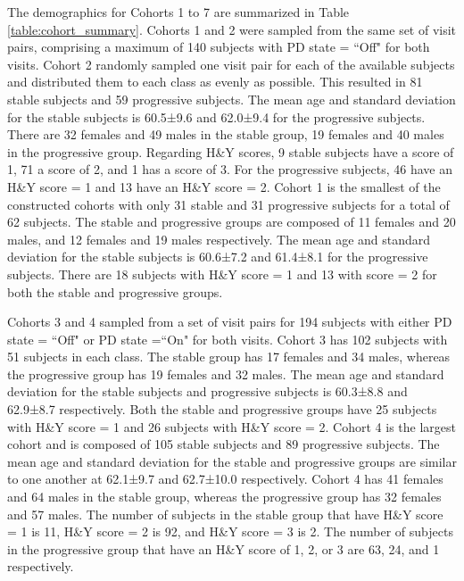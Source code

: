 The demographics for Cohorts 1 to 7 are summarized in Table \ref{table:cohort_summary}. Cohorts 1 and 2 were sampled from the same set of visit pairs, comprising a 
maximum of 140 subjects with PD state = ``Off" for both visits. Cohort 2 randomly sampled one visit pair for each of the available subjects and 
distributed them to each class as evenly as possible. This resulted in 81 stable subjects and 59 progressive subjects. The mean age and standard deviation for the stable subjects 
is 60.5±9.6 and 62.0±9.4 for the progressive subjects. There are 32 females and 49 males in the stable group, 19 females and 40 males in the progressive group. 
Regarding H\&Y scores, 9 stable subjects have a score of 1, 71 a score of 2, and 1 has a score of 3. For the progressive subjects, 46 have an H\&Y 
score = 1 and 13 have an H\&Y score = 2. Cohort 1 is the smallest of the constructed cohorts with only 31 stable and 31 progressive subjects for a total of 62 
subjects. The stable and progressive groups are composed of 11 females and 20 males, and 12 females and 19 males respectively. The mean age and standard deviation for the stable 
subjects is 60.6±7.2 and 61.4±8.1 for the progressive subjects. There are 18 subjects with H\&Y score = 1 and 13 with score = 2 for both the stable and progressive 
groups.

Cohorts 3 and 4 sampled from a set of visit pairs for 194 subjects with either PD state = ``Off" or PD state =``On" for both visits. Cohort 3 has 102 subjects with 
51 subjects in each class. The stable group has 17 females and 34 males, whereas the progressive group has 19 females and 32 males. The mean age and standard deviation for the stable 
subjects and progressive subjects is 60.3±8.8 and 62.9±8.7 respectively. Both the stable and progressive groups have 25 subjects with H\&Y score = 1 and 26 subjects 
with H\&Y score = 2. Cohort 4 is the largest cohort and is composed of 105 stable subjects and 89 progressive subjects. The mean age and standard deviation for the 
stable and progressive groups are similar to one another at 62.1±9.7 and 62.7±10.0 respectively. Cohort 4 has 41 females and 64 males in the stable group, whereas the 
progressive group has 32 females and 57 males. The number of subjects in the stable group that have H\&Y score = 1 is 11, H\&Y score = 2 is 92, and H\&Y score = 3 is 2. 
The number of subjects in the progressive group that have an H\&Y score of 1, 2, or 3 are 63, 24, and 1 respectively.

